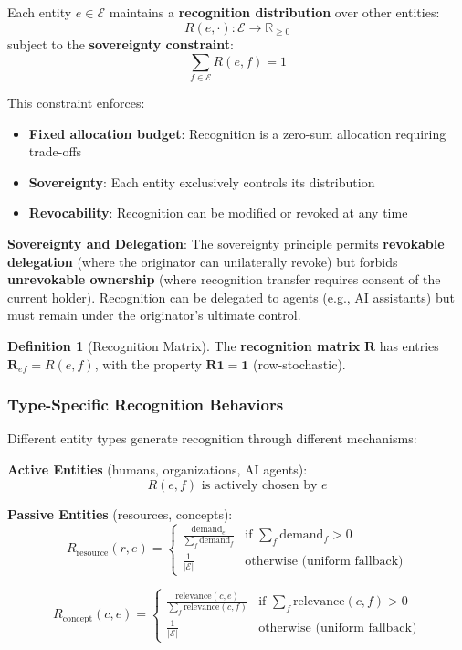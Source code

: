 \documentclass[11pt,a4paper]{article}
\theoremstyle{definition}
\newtheorem{definition}[theorem]{Definition}
\theoremstyle{remark}
\newcommand{\E}{\mathcal{E}}
\begin{document}
Each entity $e \in \E$ maintains a \textbf{recognition distribution} over other entities:
\[ R(e, \cdot): \E \rightarrow \mathbb{R}_{\ge 0} \]
subject to the \textbf{sovereignty constraint}:
\[ \sum_{f \in \E} R(e,f) = 1 \]

This constraint enforces:
\begin{itemize}
\item \textbf{Fixed allocation budget}: Recognition is a zero-sum allocation requiring trade-offs
\item \textbf{Sovereignty}: Each entity exclusively controls its distribution
\item \textbf{Revocability}: Recognition can be modified or revoked at any time
\end{itemize}

\textbf{Sovereignty and Delegation}: The sovereignty principle permits \textbf{revokable delegation} (where the originator can unilaterally revoke) but forbids \textbf{unrevokable ownership} (where recognition transfer requires consent of the current holder). Recognition can be delegated to agents (e.g., AI assistants) but must remain under the originator's ultimate control.

\begin{definition}[Recognition Matrix]
The \textbf{recognition matrix} $\mathbf{R}$ has entries $\mathbf{R}_{ef} = R(e,f)$, with the property $\mathbf{R} \mathbf{1} = \mathbf{1}$ (row-stochastic).
\end{definition}

\subsubsection{Type-Specific Recognition Behaviors}

Different entity types generate recognition through different mechanisms:

\textbf{Active Entities} (humans, organizations, AI agents):
\[ R(e,f) \text{ is actively chosen by } e \]

\textbf{Passive Entities} (resources, concepts):
\[ R_{\text{resource}}(r,e) = \begin{cases} 
\frac{\text{demand}_e}{\sum_f \text{demand}_f} & \text{if } \sum_f \text{demand}_f > 0 \\
\frac{1}{|\E|} & \text{otherwise (uniform fallback)}
\end{cases} \]

\[ R_{\text{concept}}(c,e) = \begin{cases}
\frac{\text{relevance}(c,e)}{\sum_f \text{relevance}(c,f)} & \text{if } \sum_f \text{relevance}(c,f) > 0 \\
\frac{1}{|\E|} & \text{otherwise (uniform fallback)}
\end{cases} \]
\end{document}
